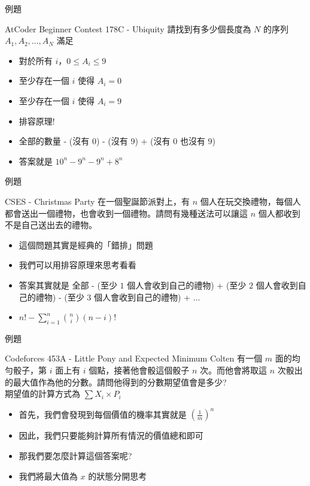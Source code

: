 \documentclass[aspectratio=169]{beamer}
\begin{document}
\begin{frame}{例題}
    \begin{block}{AtCoder Beginner Contest 178C - Ubiquity}
        請找到有多少個長度為 $N$ 的序列 $A_1,A_2,\dots,A_N$ 滿足
        \begin{itemize}
            \item 對於所有 $i$，$0 \le A_i \le 9$
            \item 至少存在一個 $i$ 使得 $A_i = 0$
            \item 至少存在一個 $i$ 使得 $A_i = 9$
        \end{itemize}
    \end{block} \pause
    \begin{itemize}
        \item 排容原理!
        \item 全部的數量 - (沒有 $0$) - (沒有 $9$) + (沒有 $0$ 也沒有 $9$)
        \item 答案就是 $10^n - 9^n - 9^n + 8^n$
    \end{itemize}
\end{frame}

\begin{frame}{例題}
    \begin{block}{CSES - Christmas Party}
        在一個聖誕節派對上，有 $n$ 個人在玩交換禮物，每個人都會送出一個禮物，也會收到一個禮物。請問有幾種送法可以讓這 $n$ 個人都收到不是自己送出去的禮物。
    \end{block}
    \begin{itemize}
        \item<1-> 這個問題其實是經典的「錯排」問題
        \item<2-> 我們可以用排容原理來思考看看
        \item<3-> 答案其實就是 全部 - (至少 $1$ 個人會收到自己的禮物) + (至少 $2$ 個人會收到自己的禮物) - (至少 $3$ 個人會收到自己的禮物) + $\ldots$
        \item<3-> $n! - \sum_{i=1}^n \binom{n}{i} (n-i)!$
    \end{itemize}
\end{frame}

\begin{frame}{例題}
    \begin{block}{Codeforces 453A - Little Pony and Expected Minimum}
        Colten 有一個 $m$ 面的均勻骰子，第 $i$ 面上有 $i$ 個點，接著他會骰這個骰子 $n$ 次。而他會將取這 $n$ 次骰出的最大值作為他的分數。請問他得到的分數期望值會是多少? \\
        \vspace{5mm}
        期望值的計算方式為 $\sum X_i \times P_i$
    \end{block} \pause
    \begin{itemize}
        \item<1-> 首先，我們會發現到每個價值的機率其實就是 $(\frac{1}{m})^n$
        \item<2-> 因此，我們只要能夠計算所有情況的價值總和即可
        \item<3-> 那我們要怎麼計算這個答案呢?
        \item<4-> 我們將最大值為 $x$ 的狀態分開思考
    \end{itemize}
\end{frame}
\end{document}
